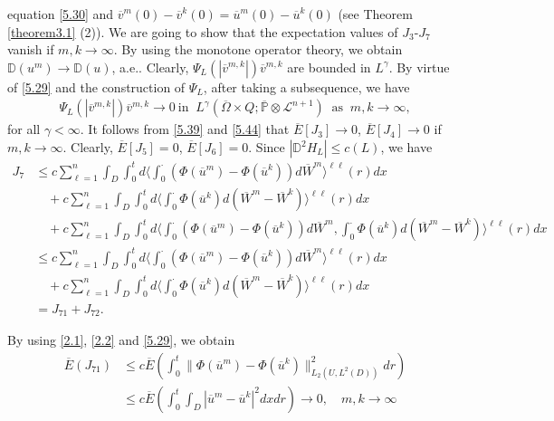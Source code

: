 \documentclass[reqno]{amsart}
\theoremstyle{definition}
\theoremstyle{remark}
\numberwithin{equation}{section} \allowdisplaybreaks
\begin{document}
equation \eqref{5.30} and
$\overline{v}^m(0)-\overline{v}^k(0)=\overline{u}^m(0)-\overline{u}^k(0)$
(see Theorem \ref{theorem3.1} (2)). We are going to show that the
expectation values of $J_3$-$J_7$ vanish if $m,k\rightarrow\infty$.
By using the monotone operator theory, we obtain
$\mathbb{D}(u^m)\rightarrow \mathbb{D}(u)$, a.e.. Clearly,
$\Psi_L(|\overline{v}^{m,k}|)\overline{v}^{m,k}$ are bounded in
$L^\gamma$. By virtue of \eqref{5.29} and the construction of
$\Psi_L$, {after taking a subsequence}, we
have
\begin{align}\label{5.55}
\Psi_L(|\overline{v}^{m,k}|)\overline{v}^{m,k}\rightarrow 0~\mbox{
in }~ L^\gamma(\overline{\Omega}\times
Q;\overline{\mathbb{P}}\otimes\mathcal{L}^{n+1})~\mbox{ as }~
m,k\rightarrow\infty,
\end{align}
for all $\gamma<\infty$. It follows from \eqref{5.39} and
\eqref{5.44} that $\overline{E}[J_3]\rightarrow0$,
$\overline{E}[J_4]\rightarrow0$ if $m,k\rightarrow\infty$. Clearly,
$\overline{E}[J_5]=0$, $\overline{E}[J_6]=0$. Since
$|\mathbb{D}^2H_L|\leq c(L)$, we have
\begin{align*}
J_7&\leq c\sum_{\ell=1}^n\int_{D}\!\!\int_0^td\langle\int_0^\cdot(\Phi(\overline{u}^m)-\Phi(\overline{u}^k))d\overline{W}^m\rangle^{{\ell\ell}}(r) dx\\
&\quad+c\sum_{\ell=1}^n\int_{D}\!\!\int_0^td\langle\int_0^\cdot\Phi(\overline{u}^k)d(\overline{W}^m-\overline{W}^k)\rangle^{\ell\ell}(r) dx\\
&\quad+c\sum_{\ell=1}^n\int_{D}\!\!\int_0^td\langle\int_0^\cdot(\Phi(\overline{u}^m)-\Phi(\overline{u}^k))d\overline{W}^m,
\int_0^\cdot\Phi(\overline{u}^k)d(\overline{W}^m-\overline{W}^k)\rangle^{\ell\ell}(r) dx\\
&\leq c\sum_{\ell=1}^n\int_{D}\!\int_0^td\langle\int_0^\cdot(\Phi(\overline{u}^m)-\Phi(\overline{u}^k))d\overline{W}^m\rangle^{\ell\ell}(r) dx\\
&\quad+c\sum_{\ell=1}^n\int_{D}\!\int_0^td\langle\int_0^\cdot\Phi(\overline{u}^k)d(\overline{W}^m-\overline{W}^k)\rangle^{\ell\ell}(r) dx\\
&=J_{71}+J_{72}.
\end{align*}

By using \eqref{2.1}, \eqref{2.2} and \eqref{5.29}, we obtain
\begin{equation*}
\begin{split}
\overline{E}(J_{71})&\leq c\overline{E}\left(\int_0^t\|\Phi(\overline{u}^m)-\Phi(\overline{u}^k)\|^2_{L_2({U},L^2(D))}dr\right)\\
&\leq
c\overline{E}\left(\int_0^t\!\!\!\int_{D}|\overline{u}^m-\overline{u}^k|^2dxdr\right)\rightarrow0,\quad
m,k\rightarrow\infty
\end{split}
\end{equation*}
\end{document}
